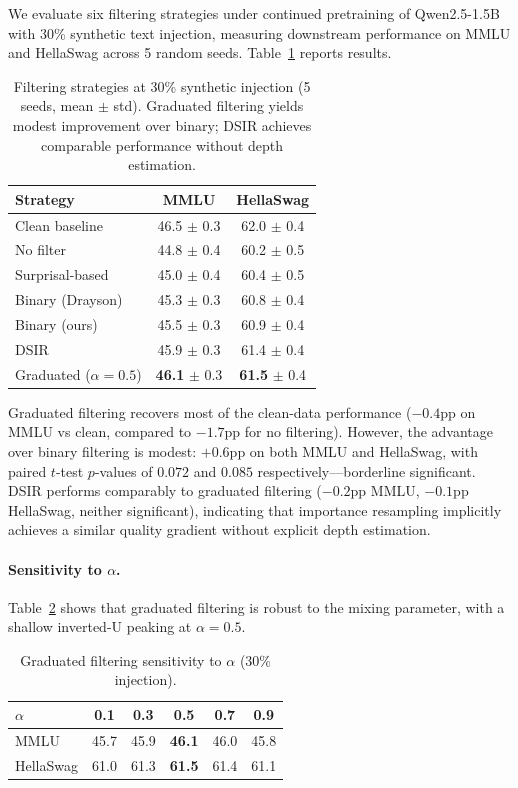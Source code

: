 \documentclass[11pt,a4paper]{article}
\begin{document}
We evaluate six filtering strategies under continued pretraining of Qwen2.5-1.5B with 30\% synthetic text injection, measuring downstream performance on MMLU and HellaSwag across 5 random seeds.
Table~\ref{tab:filtering} reports results.

\begin{table}[t]
\centering
\small
\caption{Filtering strategies at 30\% synthetic injection (5 seeds, mean $\pm$ std). Graduated filtering yields modest improvement over binary; DSIR achieves comparable performance without depth estimation.}
\label{tab:filtering}
\begin{tabular}{lcc}
\toprule
\textbf{Strategy} & \textbf{MMLU} & \textbf{HellaSwag} \\
\midrule
Clean baseline & 46.5 $\pm$ 0.3 & 62.0 $\pm$ 0.4 \\
\midrule
No filter & 44.8 $\pm$ 0.4 & 60.2 $\pm$ 0.5 \\
Surprisal-based & 45.0 $\pm$ 0.4 & 60.4 $\pm$ 0.5 \\
Binary (Drayson) & 45.3 $\pm$ 0.3 & 60.8 $\pm$ 0.4 \\
Binary (ours) & 45.5 $\pm$ 0.3 & 60.9 $\pm$ 0.4 \\
DSIR & 45.9 $\pm$ 0.3 & 61.4 $\pm$ 0.4 \\
Graduated ($\alpha\!=\!0.5$) & \textbf{46.1} $\pm$ 0.3 & \textbf{61.5} $\pm$ 0.4 \\
\bottomrule
\end{tabular}
\end{table}

Graduated filtering recovers most of the clean-data performance ($-0.4$pp on MMLU vs clean, compared to $-1.7$pp for no filtering).
However, the advantage over binary filtering is modest: $+0.6$pp on both MMLU and HellaSwag, with paired $t$-test $p$-values of $0.072$ and $0.085$ respectively---borderline significant.
DSIR performs comparably to graduated filtering ($-0.2$pp MMLU, $-0.1$pp HellaSwag, neither significant), indicating that importance resampling implicitly achieves a similar quality gradient without explicit depth estimation.

\paragraph{Sensitivity to $\alpha$.}
Table~\ref{tab:alpha} shows that graduated filtering is robust to the mixing parameter, with a shallow inverted-U peaking at $\alpha = 0.5$.

\begin{table}[t]
\centering
\small
\caption{Graduated filtering sensitivity to $\alpha$ (30\% injection).}
\label{tab:alpha}
\begin{tabular}{lccccc}
\toprule
$\alpha$ & 0.1 & 0.3 & 0.5 & 0.7 & 0.9 \\
\midrule
MMLU & 45.7 & 45.9 & \textbf{46.1} & 46.0 & 45.8 \\
HellaSwag & 61.0 & 61.3 & \textbf{61.5} & 61.4 & 61.1 \\
\bottomrule
\end{tabular}
\end{table}
\end{document}
